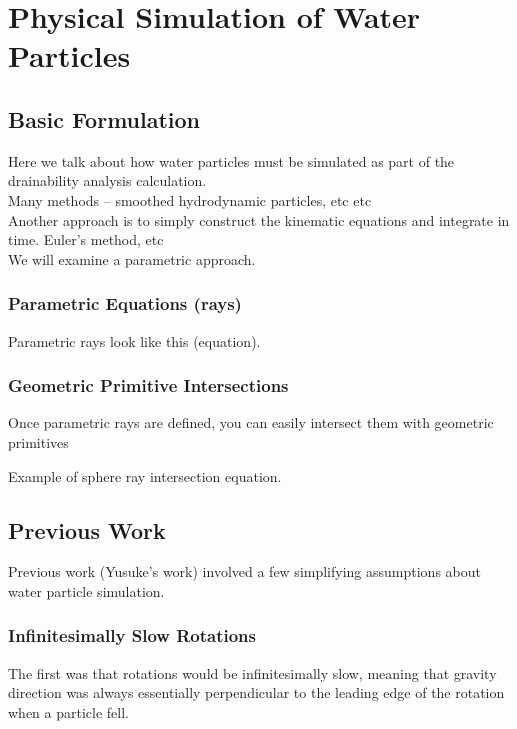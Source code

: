 						\chapter{Physical Simulation of Water Particles}

\section{Basic Formulation}

Here we talk about how water particles must be simulated as part of the drainability analysis calculation.
\\

Many methods -- smoothed hydrodynamic particles, etc etc
\\

Another approach is to simply construct the kinematic equations and integrate in time. Euler's method, etc
\\

We will examine a parametric approach.
\\

	\subsection{Parametric Equations (rays)}

Parametric rays look like this (equation).


	\subsection{Geometric Primitive Intersections}

Once parametric rays are defined, you can easily intersect them with geometric primitives

Example of sphere ray intersection equation.


\section{Previous Work}

Previous work (Yusuke's work) involved a few simplifying assumptions about water particle simulation.
\\

	\subsection{Infinitesimally Slow Rotations}
The first was that rotations would be infinitesimally slow, meaning that gravity direction was always essentially perpendicular to the leading edge of the rotation when a particle fell.

